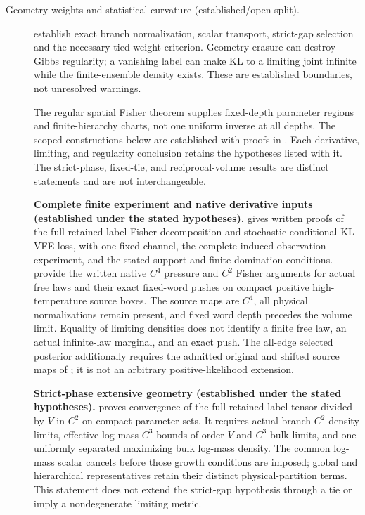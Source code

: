 \begin{description}
\item[Geometry weights and statistical curvature (established/open split).]
 establish exact
branch normalization, scalar transport, strict-gap selection and the
necessary tied-weight criterion. Geometry erasure can destroy Gibbs
regularity; a vanishing label can make KL to a limiting joint infinite
while the finite-ensemble density exists. These are established boundaries,
not unresolved warnings. 

The regular spatial Fisher theorem supplies fixed-depth parameter regions
and finite-hierarchy charts, not one uniform inverse at all depths.
The scoped constructions below are established with proofs in
.
Each derivative, limiting, and regularity conclusion retains the hypotheses
listed with it. The strict-phase, fixed-tie, and reciprocal-volume results
are distinct statements and are not interchangeable.

\textbf{Complete finite experiment and native derivative inputs
(established under the stated hypotheses).}
 gives written proofs of the full
retained-label Fisher decomposition and stochastic conditional-KL VFE
loss, with one fixed channel, the complete induced observation experiment,
and the stated support and finite-domination conditions.
provide the written native $C^4$ pressure and $C^2$ Fisher arguments for
actual free laws and their exact fixed-word pushes on compact positive
high-temperature source boxes. The source maps are $C^4$, all physical
normalizations remain present, and fixed word depth precedes the volume
limit. Equality of limiting densities does not identify a finite free
law, an actual infinite-law marginal, and an exact push.
The all-edge selected posterior additionally requires the admitted
original and shifted source maps of
; it is not an arbitrary
positive-likelihood extension. 

\textbf{Strict-phase extensive geometry (established under the stated hypotheses).}
 proves convergence
of the full retained-label tensor divided by $V$ in $C^2$ on compact
parameter sets. It requires actual branch $C^2$ density limits,
effective log-mass $C^3$ bounds of order $V$ and $C^3$ bulk limits,
and one uniformly separated maximizing bulk log-mass density.
The common log-mass scalar cancels before those growth conditions are
imposed; global and hierarchical representatives retain their distinct
physical-partition terms. This statement does not extend the strict-gap
hypothesis through a tie or imply a nondegenerate limiting metric.


\end{description}
